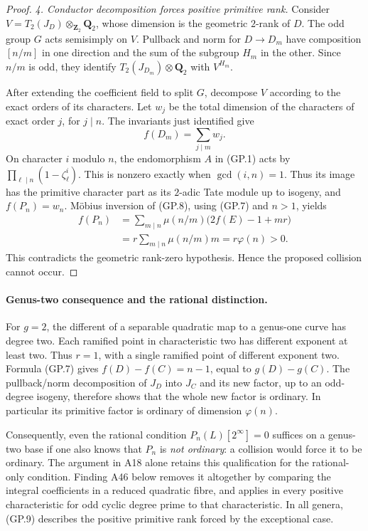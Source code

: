 \documentclass[11pt,a4paper]{article}
\begin{document}
\begin{proof}
\emph{4. Conductor decomposition forces positive primitive rank.}
Consider
$V=T_2(J_D)\otimes_{\mathbf Z_2}\mathbf Q_2$,
whose dimension is the geometric $2$-rank of $D$.
The odd group $G$ acts semisimply on $V$.
Pullback and norm for $D\to D_m$ have composition
$[n/m]$ in one direction and the sum of the subgroup
$H_m$ in the other.  Since $n/m$ is odd, they identify
$T_2(J_{D_m})\otimes\mathbf Q_2$ with $V^{H_m}$.

After extending the coefficient field to split $G$, decompose
$V$ according to the exact orders of its characters.
Let $w_j$ be the total dimension of the characters of exact
order $j$, for $j\mid n$.  The invariants just identified give
\[
                           f(D_m)=\sum_{j\mid m}w_j.
 \tag{GP.8}
\]
On character $i$ modulo $n$, the endomorphism $A$ in (GP.1)
acts by
$\prod_{\ell\mid n}(1-\zeta_\ell^i)$.
This is nonzero exactly when $\gcd(i,n)=1$.
Thus its image has the primitive character part as its
$2$-adic Tate module up to isogeny, and
$f(P_n)=w_n$.
M\"obius inversion of (GP.8), using (GP.7) and $n>1$, yields
\[
\begin{aligned}
 f(P_n)
   &=\sum_{m\mid n}\mu(n/m)\bigl(2f(E)-1+mr\bigr)\\
   &=r\sum_{m\mid n}\mu(n/m)m
     =r\varphi(n)>0.
\end{aligned}
 \tag{GP.9}
\]
This contradicts the geometric rank-zero hypothesis.
Hence the proposed collision cannot occur.
\end{proof}

\paragraph{Genus-two consequence and the rational distinction.}
For $g=2$, the different of a separable quadratic map to a
genus-one curve has degree two.  Each ramified point in
characteristic two has different exponent at least two.
Thus $r=1$, with a single ramified point of different exponent
two.  Formula (GP.7) gives
$f(D)-f(C)=n-1$, equal to $g(D)-g(C)$.
The pullback/norm decomposition of $J_D$ into $J_C$ and its
new factor, up to an odd-degree isogeny, therefore shows that
the whole new factor is ordinary.  In particular its primitive
factor is ordinary of dimension $\varphi(n)$.

Consequently, even the rational condition
$P_n(L)[2^\infty]=0$ suffices on a genus-two base if one also
knows that $P_n$ is \emph{not ordinary}: a collision would force
it to be ordinary.  The argument in A18 alone retains this qualification for the
rational-only condition. Finding A46 below removes it altogether
by comparing the integral coefficients in a reduced quadratic fibre,
and applies in every positive characteristic for odd cyclic degree
prime to that characteristic.  In all genera, (GP.9)
describes the positive primitive rank forced by the
exceptional case.
\end{document}
